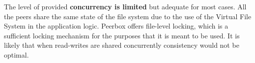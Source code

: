 The level of provided \textbf{concurrency is limited} but adequate for most cases. All the peers share the same state of the file system due to the use of the Virtual File System in the application logic. Peerbox offers file-level locking, which is a sufficient locking mechanism for the purposes that it is meant to be used. It is likely that when read-writes are shared concurrently consistency would not be optimal. 

% 
